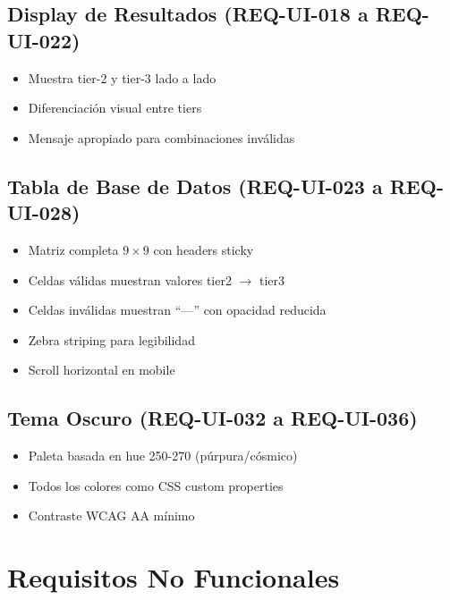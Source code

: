 \documentclass[11pt,a4paper]{report}
\begin{document}
\subsection{Display de Resultados (REQ-UI-018 a REQ-UI-022)}
\begin{itemize}
  \item Muestra tier-2 y tier-3 lado a lado
  \item Diferenciación visual entre tiers
  \item Mensaje apropiado para combinaciones inválidas
\end{itemize}

\subsection{Tabla de Base de Datos (REQ-UI-023 a REQ-UI-028)}
\begin{itemize}
  \item Matriz completa $9 \times 9$ con headers sticky
  \item Celdas válidas muestran valores tier2 $\rightarrow$ tier3
  \item Celdas inválidas muestran ``---'' con opacidad reducida
  \item Zebra striping para legibilidad
  \item Scroll horizontal en mobile
\end{itemize}

\subsection{Tema Oscuro (REQ-UI-032 a REQ-UI-036)}
\begin{itemize}
  \item Paleta basada en hue 250-270 (púrpura/cósmico)
  \item Todos los colores como CSS custom properties
  \item Contraste WCAG AA mínimo
\end{itemize}

\section{Requisitos No Funcionales}
\end{document}
